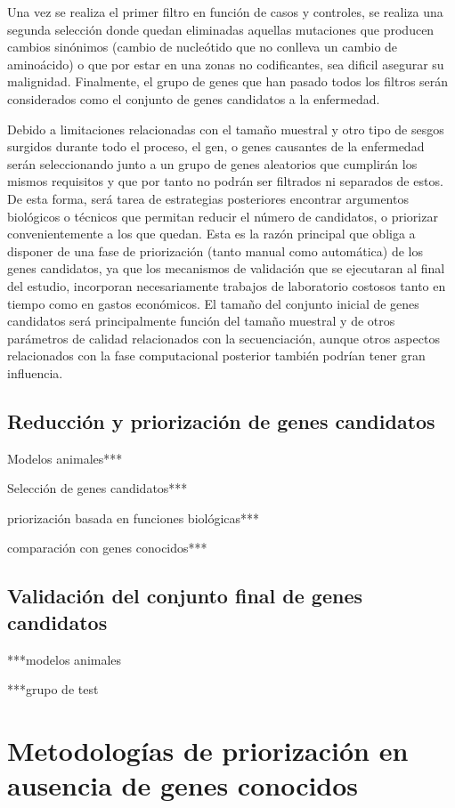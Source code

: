 \medskip
Una vez se realiza el primer filtro en función de casos y controles, se realiza una segunda selección donde quedan eliminadas aquellas mutaciones que producen cambios sinónimos (cambio de nucleótido que no conlleva un cambio de aminoácido)  o que por estar en una zonas no codificantes, sea dificil asegurar su malignidad. Finalmente, el grupo de genes que han pasado todos los filtros serán considerados como el conjunto de genes candidatos a la enfermedad. 

\medskip
Debido a limitaciones relacionadas con el tamaño muestral y otro tipo de sesgos surgidos durante todo el proceso, el gen, o genes causantes de la enfermedad serán seleccionando junto a un grupo de genes aleatorios que cumplirán los mismos requisitos y que por tanto no podrán ser filtrados ni separados de estos. De esta forma, será tarea de estrategias posteriores encontrar argumentos biológicos o técnicos que permitan reducir el número de candidatos, o priorizar convenientemente a los que quedan. Esta es la razón principal que obliga a disponer de una fase de priorización (tanto manual como automática) de los genes candidatos, ya que los mecanismos de validación que se ejecutaran al final del estudio, incorporan necesariamente trabajos de laboratorio costosos tanto en tiempo como en gastos económicos. El tamaño del conjunto inicial de genes candidatos será principalmente función del tamaño muestral y de otros parámetros de calidad relacionados con la secuenciación, aunque otros aspectos relacionados con la fase computacional posterior también podrían tener gran influencia.


\subsection{Reducción y priorización de genes candidatos}

\medskip
Modelos animales***

Selección de genes candidatos***

priorización basada en funciones biológicas***

comparación con genes conocidos***


\subsection{Validación del conjunto final de genes candidatos}

***modelos animales


***grupo de test


\section{Metodologías de priorización en ausencia de genes conocidos}





